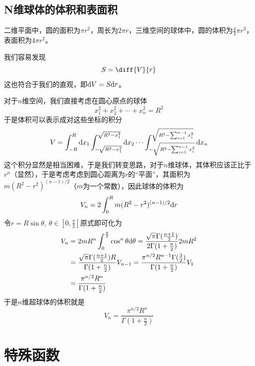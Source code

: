 \documentclass[AutoFakeBold]{tstextbook}
\begin{document}
\subsection{N维球体的体积和表面积} %
\label{sub:N维球体的体积和表面积}
二维平面中，圆的面积为$\pi r^2$，周长为$2\pi r$，三维空间的球体中，圆的体积为$\frac{4}{3}\pi r^3$，表面积为$4\pi r^2$。

我们容易发现\begin{equation}
    S=\diff{V}{r}
\end{equation}
这也符合于我们的直观，即$\mathrm{d} V=S\mathrm{d} r$。

对于$n$维空间，我们直接考虑在圆心原点的球体
\begin{equation}
    x_1^2+x_2^2+\cdots +x_n^2=R^2
\end{equation}
于是体积可以表示成对这些坐标的积分\begin{equation}
    V=\int_{-R}^R \mathrm{d} x_1 \int_{-\sqrt{R^2-x_1^2}}^{\sqrt{R^2-x_1^2}}\mathrm{d} x_2\cdots \int_{-\sqrt{R^2-\sum_{i=1}^{n-1}x_i^2}}^{\sqrt{R^2-\sum_{i=1}^{n-1}x_i^2}} \mathrm{d} x_n
\end{equation}
这个积分显然是相当困难，于是我们转变思路，对于$n$维球体，其体积应该正比于$r^n$（显然），于是考虑考虑到圆心距离为$r$的“平面”，其面积为$m (R^2-r^2)^{(n-1)/2}$（$m$为一个常数），因此球体的体积为\begin{equation}
    V_n=2\int_0^R m(R^2-r^2)^{(n-1)/2} \mathrm{d} r
\end{equation}
令$r=R\sin \theta,\ \theta \in [0,\frac{\pi}{2}]$原式即可化为\begin{equation}
    \begin{aligned}
        V_n & =2m R^n \int_0^{\frac{\pi}{2}}\cos^{n}\theta\mathrm{d}\theta=\frac{\sqrt{\pi} \Gamma(\frac{n+1}{2})}{2\Gamma(1+\frac{n}{2})} 2m R^2 \\&=\frac{\sqrt{\pi} \Gamma(\frac{n+1}{2})R}{\Gamma(1+\frac{n} {2})}V_{n-1}=\frac{\pi^{n/2}R^{n-1}\Gamma(\frac{3}{2})}{\Gamma(1+\frac{n}{2})} V_1\\
            & =\frac{\pi^{n/2}R^n}{\Gamma(1+\frac{n}{2})}
    \end{aligned}
\end{equation}
于是$n$维超球体的体积就是\begin{equation}
    V_n =\frac{\pi^{n/2}R^n}{\Gamma(1+\frac{n}{2})}
\end{equation}
\section{特殊函数} %
\label{sec:特殊函数}
\end{document}
